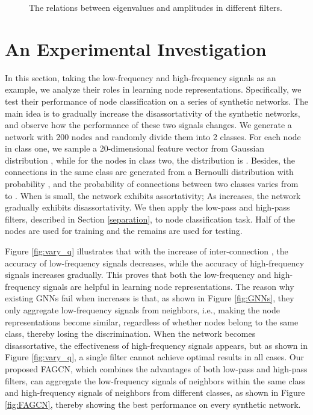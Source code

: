 \documentclass[letterpaper]{article} \usepackage{aaai21}  \usepackage{times}  \usepackage{helvet} \usepackage{courier}  \usepackage[hyphens]{url}  \usepackage{graphicx} \urlstyle{rm} \def\UrlFont{\rm}  \usepackage{natbib}  \usepackage{caption} \frenchspacing  \setlength{\pdfpagewidth}{8.5in}  \setlength{\pdfpageheight}{11in}
\begin{document}
\begin{figure*}
\centering
{}
\caption{The relations between eigenvalues and amplitudes in different filters.}
\label{functions}
\end{figure*}

\section{An Experimental Investigation}
\label{case}

In this section, taking the low-frequency and high-frequency signals as an example, we analyze their roles in learning node representations. Specifically, we test their performance of node classification on a series of synthetic networks.
The main idea is to gradually increase the disassortativity of the synthetic networks, and observe how the performance of these two signals changes.
We generate a network with 200 nodes and randomly divide them into 2 classes.
For each node in class one, we sample a 20-dimensional feature vector from Gaussian distribution , while for the nodes in class two, the distribution is .
Besides, the connections in the same class are generated from a Bernoulli distribution with probability , and the probability of connections between two classes  varies from  to . When  is small, the network exhibits assortativity; As  increases, the network gradually exhibits disassortativity.
We then apply the low-pass and high-pass filters, described in Section \ref{separation}, to node classification task. Half of the nodes are used for training and the remains are used for testing.

Figure \ref{fig:vary_q} illustrates that with the increase of inter-connection , the accuracy of low-frequency signals decreases, while the accuracy of high-frequency signals increases gradually.
This proves that both the low-frequency and high-frequency signals are helpful in learning node representations.
The reason why existing GNNs fail when  increases is that, as shown in Figure \ref{fig:GNNs}, they only aggregate low-frequency signals from neighbors, i.e., making the node representations become similar, regardless of whether nodes belong to the same class, thereby losing the discrimination. 
When the network becomes disassortative, the effectiveness of high-frequency signals appears, but as shown in Figure \ref{fig:vary_q}, a single filter cannot achieve optimal results in all cases. Our proposed FAGCN, which combines the advantages of both low-pass and high-pass filters, can aggregate the low-frequency signals of neighbors within the same class and high-frequency signals of neighbors from different classes, as shown in Figure \ref{fig:FAGCN}, thereby showing the best performance on every synthetic network.
\end{document}
